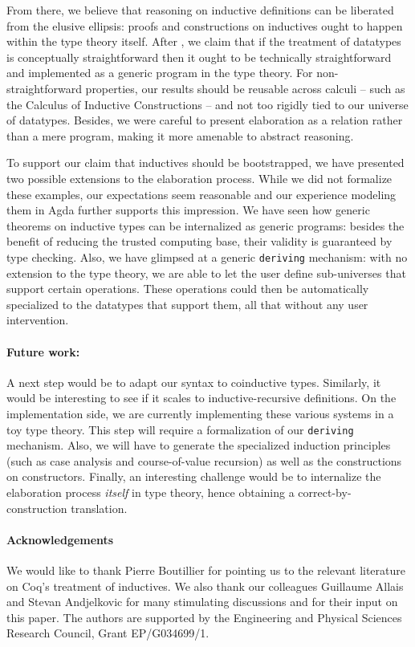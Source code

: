\documentclass{scrartcl}
\theoremstyle{plain}
\theoremstyle{definition}
\begin{document}
From there, we believe that reasoning on inductive definitions can be
liberated from the elusive ellipsis: proofs and constructions on
inductives ought to happen within the type theory itself. After
\citet{harper:elaboration}, we claim that if the treatment of
datatypes is conceptually straightforward then it ought to be
technically straightforward and implemented as a generic program in
the type theory. For non-straightforward properties, our results
should be reusable across calculi -- such as the Calculus of Inductive
Constructions -- and not too rigidly tied to our universe of
datatypes. Besides, we were careful to present elaboration as a
relation rather than a mere program, making it more amenable to
abstract reasoning.



To support our claim that inductives should be bootstrapped, we have
presented two possible extensions to the elaboration process. While we
did not formalize these examples, our expectations seem reasonable and
our experience modeling them in Agda further supports this
impression. We have seen how generic theorems on inductive types can
be internalized as generic programs: besides the benefit of reducing
the trusted computing base, their validity is guaranteed by type
checking. Also, we have glimpsed at a generic \texttt{deriving}
mechanism: with no extension to the type theory, we are able to
let the user define sub-universes that support certain
operations. These operations could then be automatically specialized
to the datatypes that support them, all that without any user
intervention.



\paragraph{Future work:} A next step would be to adapt our syntax to coinductive
types. Similarly, it would be interesting to see if it scales to
inductive-recursive definitions. On the implementation side, we are
currently implementing these various systems in a toy type
theory. This step will require a formalization of our
\texttt{deriving} mechanism. Also, we will have to generate the
specialized induction principles (such as case analysis and
course-of-value recursion) as well as the constructions on
constructors. Finally, an interesting challenge would be to
internalize the elaboration process \emph{itself} in type theory,
hence obtaining a correct-by-construction translation.

\paragraph{Acknowledgements} 
We would like to thank Pierre Boutillier for pointing us to the
relevant literature on Coq's treatment of inductives. We also thank
our colleagues Guillaume Allais and Stevan Andjelkovic for many
stimulating discussions and for their input on this paper. The authors
are supported by the Engineering and Physical Sciences Research
Council, Grant EP/G034699/1.



\newpage

 
\end{document}
